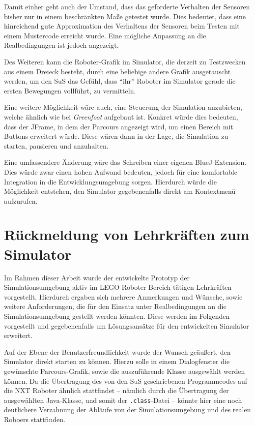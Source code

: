 \documentclass[paper=a4, DIV=calc, BCOR=12mm, twoside=on, onecolumn=on, open = right, titlepage =on, parskip =half-, headsepline = on, footsepline = off, chapterprefix = off, appendixprefix = on, fontsize = 12pt, numbers = noenddot, abstract = on]{scrbook}
\begin{document}
Damit einher geht auch der Umstand, dass das geforderte Verhalten der Sensoren bisher nur in einem beschränkten Maße getestet wurde. Dies bedeutet,
dass eine hinreichend gute Approximation des Verhaltens der Sensoren beim
Testen mit einem Mustercode erreicht wurde. Eine mögliche Anpassung an die Realbedingungen ist jedoch angezeigt.

Des Weiteren kann die Roboter-Grafik im Simulator, die derzeit zu Testzwecken aus einem Dreieck besteht, durch eine beliebige andere Grafik ausgetauscht werden, um den SuS das Gefühl, dass "`ihr"' Roboter im Simulator gerade die ersten Bewegungen vollführt, zu vermitteln.

Eine weitere Möglichkeit wäre auch, eine Steuerung der Simulation anzubieten, welche ähnlich wie bei \emph{Greenfoot} aufgebaut ist. Konkret würde dies bedeuten, dass der JFrame, in dem der Parcours angezeigt wird, um einen Bereich mit Buttons erweitert würde. Diese wären dann in der Lage, die Simulation zu starten, pausieren und anzuhalten.

Eine umfassendere Änderung wäre das Schreiben einer eigenen BlueJ Extension. Dies würde zwar einen hohen Aufwand bedeuten, jedoch für eine komfortable Integration in die Entwicklungsumgebung sorgen. Hierdurch würde die Möglichkeit entstehen, den Simulator gegebenenfalls direkt am Kontextmenü aufzurufen.

\section{Rückmeldung von Lehrkräften zum Simulator}

Im Rahmen dieser Arbeit wurde der entwickelte Prototyp der Simulationsumgebung aktiv im \textsc{LEGO}-Roboter-Bereich tätigen Lehrkräften vorgestellt. Hierdurch ergaben sich mehrere Anmerkungen und Wünsche, sowie weitere Anforderungen, die für den Einsatz unter Realbedingungen an die Simulationsumgebung gestellt werden könnten. Diese werden im Folgenden vorgestellt und gegebenenfalls um Lösungsansätze für den entwickelten Simulator erweitert.

Auf der Ebene der Benutzerfreundlichkeit wurde der Wunsch geäußert, den Simulator direkt starten zu können. Hierzu solle in einem Dialogfenster die gewünschte Parcours-Grafik, sowie die auszuführende Klasse ausgewählt werden können. Da die Übertragung des von den SuS geschriebenen Programmcodes auf die NXT Roboter ähnlich stattfindet -- nämlich durch die Übertragung der ausgewählten Java-Klasse, und somit der \texttt{.class}-Datei -- könnte hier eine noch deutlichere Verzahnung der Abläufe von der Simulationsumgebung und des realen Roboers stattfinden.
\end{document}
